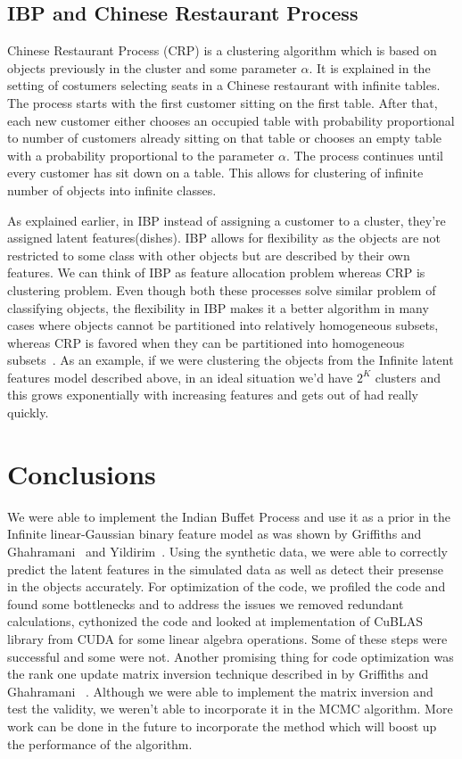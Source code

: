 \documentclass{article}
\begin{document}
\subsection{IBP and Chinese Restaurant Process}

Chinese Restaurant Process (CRP) is a clustering algorithm which is based on objects previously in the cluster and some parameter $\alpha$. It is explained in the setting of costumers selecting seats in a Chinese restaurant with infinite tables. The process starts with the first customer sitting on the first table. After that, each new customer either chooses an occupied table with probability proportional to number of customers already sitting on that table or chooses an empty table with a probability proportional to the parameter $\alpha$. The process continues until every customer has sit down on a table. This allows for clustering of infinite number of objects into infinite classes.

As explained earlier, in IBP instead of assigning a customer to a cluster, they're assigned latent features(dishes). IBP allows for flexibility as the objects are not restricted to some class with other objects but are described by their own features. We can think of IBP as feature allocation problem whereas CRP is clustering problem. Even though both these processes solve similar problem of classifying objects, the flexibility in IBP makes it a better algorithm in many cases where objects cannot be partitioned into relatively homogeneous subsets, whereas CRP is favored when they can be partitioned into homogeneous subsets~\cite{griffiths}. As an example, if we were clustering the objects from the Infinite latent features model described above, in an ideal situation we'd have $2^K$ clusters and this grows exponentially with increasing features and gets out of had really quickly.


\section{Conclusions}
We were able to implement the Indian Buffet Process and use it as a prior in the Infinite linear-Gaussian binary feature model as was shown by Griffiths and Ghahramani~\cite{griffiths} and Yildirim~\cite{yildirim}. Using the synthetic data, we were able to correctly predict the latent features in the simulated data as well as detect their presense in the objects accurately. For optimization of the code, we profiled the code and found some bottlenecks and to address the issues we removed redundant calculations, cythonized the code and looked at implementation of CuBLAS library from CUDA for some linear algebra operations. Some of these steps were successful and some were not. Another promising thing for code optimization was the rank one update matrix inversion technique described in by Griffiths and Ghahramani ~\cite{griffiths1}. Although we were able to implement the matrix inversion and test the validity, we weren't able to incorporate it in the MCMC algorithm. More work can be done in the future to incorporate the method which will boost up the performance of the algorithm.



{}

\end{document}
